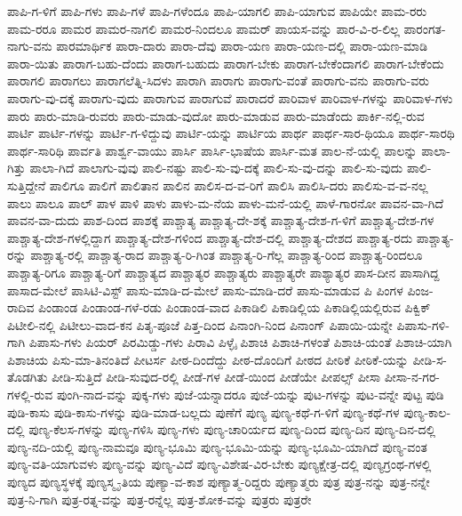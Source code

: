 {ಪಾಪಿ-ಗ-ಳಿಗೆ
ಪಾಪಿ-ಗಳು
ಪಾಪಿ-ಗಳೆ
ಪಾಪಿ-ಗಳೆಂದೂ
ಪಾಪಿ-ಯಾಗಲಿ
ಪಾಪಿ-ಯಾಗುವ
ಪಾಪಿಯೇ
ಪಾಮ-ರರು
ಪಾಮ-ರರೂ
ಪಾಮರ
ಪಾಮರ-ನಾಗಲಿ
ಪಾಮರ-ನಿಂದಲೂ
ಪಾಮರ್
ಪಾಯಸ-ವನ್ನು
ಪಾರ-ವಿ-ರ-ಲಿಲ್ಲ
ಪಾರಂಗತ-ನಾಗು-ವನು
ಪಾರಮಾರ್ಥಿಕ
ಪಾರಾ-ದಾರು
ಪಾರಾ-ದೆವು
ಪಾರಾ-ಯಣ
ಪಾರಾ-ಯಣ-ದಲ್ಲಿ
ಪಾರಾ-ಯಣ-ಮಾಡಿ
ಪಾರಾ-ಯಿತು
ಪಾರಾಗ-ಬಹು-ದೆಂದು
ಪಾರಾಗ-ಬಹುದು
ಪಾರಾಗ-ಬೇಕು
ಪಾರಾಗ-ಬೇಕೆಂದಾಗಲಿ
ಪಾರಾಗ-ಬೇಕೆಂದು
ಪಾರಾಗಲಿ
ಪಾರಾಗಲು
ಪಾರಾಗಲೆತ್ನಿ-ಸಿದಳು
ಪಾರಾಗಿ
ಪಾರಾಗು
ಪಾರಾಗು-ವಂತೆ
ಪಾರಾಗು-ವನು
ಪಾರಾಗು-ವರು
ಪಾರಾಗು-ವು-ದಕ್ಕೆ
ಪಾರಾಗು-ವುದು
ಪಾರಾಗುವ
ಪಾರಾಗುವೆ
ಪಾರಾದರೆ
ಪಾರಿವಾಳ
ಪಾರಿವಾಳ-ಗಳನ್ನು
ಪಾರಿವಾಳ-ಗಳು
ಪಾರು
ಪಾರು-ಮಾಡಿ-ರುವರು
ಪಾರು-ಮಾಡು-ವುದೋ
ಪಾರು-ಮಾಡುವ
ಪಾರು-ಮಾಡೆಂದು
ಪಾರ್ಕಿ-ನಲ್ಲಿ-ರುವ
ಪಾರ್ಟಿ
ಪಾರ್ಟಿ-ಗಳನ್ನು
ಪಾರ್ಟಿ-ಗ-ಳಿದ್ದುವು
ಪಾರ್ಟಿ-ಯನ್ನು
ಪಾರ್ಟಿಯ
ಪಾರ್ಥ
ಪಾರ್ಥ-ಸಾರ-ಥಿಯೂ
ಪಾರ್ಥ-ಸಾರಥಿ
ಪಾರ್ಥ-ಸಾರಿಥಿ
ಪಾರ್ವತಿ
ಪಾರ್ಶ್ವ-ವಾಯು
ಪಾರ್ಸಿ
ಪಾರ್ಸಿ-ಭಾಷೆಯ
ಪಾರ್ಸಿ-ಮತ
ಪಾಲ-ನೆ-ಯಲ್ಲಿ
ಪಾಲನ್ನು
ಪಾಲಾ-ಗಿತ್ತು
ಪಾಲಾ-ಗಿದೆ
ಪಾಲಾಗು-ವುವು
ಪಾಲಿ-ನಷ್ಟು
ಪಾಲಿ-ಸು-ವು-ದಕ್ಕೆ
ಪಾಲಿ-ಸು-ವು-ದನ್ನು
ಪಾಲಿ-ಸು-ವುದು
ಪಾಲಿ-ಸುತ್ತಿದ್ದೇನೆ
ಪಾಲಿಗೂ
ಪಾಲಿಗೆ
ಪಾಲಿತಾನ
ಪಾಲಿನ
ಪಾಲಿಸ-ದ-ವ-ರಿಗೆ
ಪಾಲಿಸಿ
ಪಾಲಿಸಿ-ದರು
ಪಾಲಿಸು-ವ-ವ-ನಲ್ಲ
ಪಾಲು
ಪಾಲೂ
ಪಾಲ್
ಪಾಳ
ಪಾಳಿ
ಪಾಳು
ಪಾಳು-ಮ-ನೆಯ
ಪಾಳು-ಮನೆ-ಯಲ್ಲಿ
ಪಾಳೆ-ಗಾರನೋ
ಪಾವನ-ವಾ-ಗಿದೆ
ಪಾವನ-ವಾ-ದುದು
ಪಾಶ-ದಿಂದ
ಪಾಶಕ್ಕೆ
ಪಾಶ್ಚಾತ್ಯ
ಪಾಶ್ಚಾತ್ಯ-ದೇ-ಶಕ್ಕೆ
ಪಾಶ್ಚಾತ್ಯ-ದೇಶ-ಗ-ಳಿಗೆ
ಪಾಶ್ಚಾತ್ಯ-ದೇಶ-ಗಳ
ಪಾಶ್ಚಾತ್ಯ-ದೇಶ-ಗಳಲ್ಲಿದ್ದಾಗ
ಪಾಶ್ಚಾತ್ಯ-ದೇಶ-ಗಳಿಂದ
ಪಾಶ್ಚಾತ್ಯ-ದೇಶ-ದಲ್ಲಿ
ಪಾಶ್ಚಾತ್ಯ-ದೇಶದ
ಪಾಶ್ಚಾತ್ಯ-ರದು
ಪಾಶ್ಚಾತ್ಯ-ರನ್ನು
ಪಾಶ್ಚಾತ್ಯ-ರಲ್ಲಿ
ಪಾಶ್ಚಾತ್ಯ-ರಾದ
ಪಾಶ್ಚಾತ್ಯ-ರಿ-ಗಿಂತ
ಪಾಶ್ಚಾತ್ಯ-ರಿ-ಗೆಲ್ಲ
ಪಾಶ್ಚಾತ್ಯ-ರಿಂದ
ಪಾಶ್ಚಾತ್ಯ-ರಿಂದಲೂ
ಪಾಶ್ಚಾತ್ಯ-ರಿಗೂ
ಪಾಶ್ಚಾತ್ಯ-ರಿಗೆ
ಪಾಶ್ಚಾತ್ಯದ
ಪಾಶ್ಚಾತ್ಯರ
ಪಾಶ್ಚಾತ್ಯರು
ಪಾಶ್ಚಾತ್ಯರೇ
ಪಾಶ್ಯಾತ್ಯರ
ಪಾಸ-ದೀನ
ಪಾಸಾಗಿದ್ದ
ಪಾಸಾದ-ಮೇಲೆ
ಪಾಸಿಟಿ-ವಿಸ್ಟ್
ಪಾಸು-ಮಾಡಿ-ದ-ಮೇಲೆ
ಪಾಸು-ಮಾಡಿ-ದರೆ
ಪಾಸು-ಮಾಡುವ
ಪಿ
ಪಿಂಗಳ
ಪಿಂಜ-ರಾದಿವ
ಪಿಂಡಾಂಡ
ಪಿಂಡಾಂಡ-ಗಳೆ-ರಡು
ಪಿಂಡಾಂಡ-ವಾದ
ಪಿಕಾಡಿಲಿ
ಪಿಕಾಡಿಲ್ಲಿಯ
ಪಿಕಾಡಿಲ್ಲಿಯಲ್ಲಿರುವ
ಪಿಕ್ವಿಕ್
ಪಿಟೀಲಿ-ನಲ್ಲಿ
ಪಿಟೀಲು-ವಾದ-ಕನ
ಪಿತೃ-ಪೂಜೆ
ಪಿತ್ತ-ದಿಂದ
ಪಿನಾಂಗಿ-ನಿಂದ
ಪಿನಾಂಗ್
ಪಿಪಾಯಿ-ಯನ್ನೇ
ಪಿಪಾಸು-ಗಳಿ-ಗಾಗಿ
ಪಿಪಾಸು-ಗಳು
ಪಿಯರ್
ಪಿರಮಿಡ್ಡು-ಗಳು
ಪಿರಾವಿ
ಪಿಳ್ಳೈ
ಪಿಶಾಚಿ
ಪಿಶಾಚಿ-ಗಳಂತೆ
ಪಿಶಾಚಿ-ಯಂತೆ
ಪಿಶಾಚಿ-ಯಾಗಿ
ಪಿಶಾಚಿಯ
ಪಿಸು-ಮಾ-ತಿನಂತಿದೆ
ಪೀಟರ್ಸ
ಪೀಠ-ದಿಂದೆದ್ದು
ಪೀಠ-ದೊಂದಿಗೆ
ಪೀಠದ
ಪೀಠಿಕೆ
ಪೀಠಿಕೆ-ಯನ್ನು
ಪೀಡಿ-ಸ-ತೊಡಗಿತು
ಪೀಡಿ-ಸುತ್ತಿದೆ
ಪೀಡಿ-ಸುವುದ-ರಲ್ಲಿ
ಪೀಡೆ-ಗಳ
ಪೀಡೆ-ಯಿಂದ
ಪೀಡೆಯೇ
ಪೀಪಲ್ಸ್
ಪೀಸಾ
ಪೀಸಾ-ನ-ಗರ-ಗಳಲ್ಲಿ-ರುವ
ಪುಂಗಿ-ನಾದ-ವನ್ನು
ಪುಕ್ಕ-ಗಳು
ಪುಜೆ-ಯನ್ನಾದರೂ
ಪುಜೆ-ಯನ್ನು
ಪುಟ-ಗಳನ್ನು
ಪುಟ-ವನ್ನೇ
ಪುಟ್ಟ
ಪುಡಿ
ಪುಡಿ-ಕಾಸು
ಪುಡಿ-ಕಾಸು-ಗಳನ್ನು
ಪುಡಿ-ಮಾಡ-ಬಲ್ಲದು
ಪುಣೆಗೆ
ಪುಣ್ಯ
ಪುಣ್ಯ-ಕಥೆ-ಗ-ಳಿಗೆ
ಪುಣ್ಯ-ಕಥೆ-ಗಳ
ಪುಣ್ಯ-ಕಾಲ-ದಲ್ಲಿ
ಪುಣ್ಯ-ಕೆಲಸ-ಗಳನ್ನು
ಪುಣ್ಯ-ಗಳಿಸಿ
ಪುಣ್ಯ-ಗಳು
ಪುಣ್ಯ-ಚಾರಿರ್ಯದ
ಪುಣ್ಯ-ದಿಂದ
ಪುಣ್ಯ-ದಿನ
ಪುಣ್ಯ-ದಿನ-ದಲ್ಲಿ
ಪುಣ್ಯ-ನದಿ-ಯಲ್ಲಿ
ಪುಣ್ಯ-ನಾಮವೂ
ಪುಣ್ಯ-ಭೂಮಿ
ಪುಣ್ಯ-ಭೂಮಿ-ಯನ್ನು
ಪುಣ್ಯ-ಭೂಮಿ-ಯಾಗಿದೆ
ಪುಣ್ಯ-ವಂತ
ಪುಣ್ಯ-ವತಿ-ಯಾಗುವಳು
ಪುಣ್ಯ-ವನ್ನು
ಪುಣ್ಯ-ವಿದೆ
ಪುಣ್ಯ-ವಿಶೇಷ-ವಿರ-ಬೇಕು
ಪುಣ್ಯಕ್ಷೇತ್ರ-ದಲ್ಲಿ
ಪುಣ್ಯಗ್ರಂಥ-ಗಳಲ್ಲಿ
ಪುಣ್ಯದ
ಪುಣ್ಯಸ್ಥಳಕ್ಕೆ
ಪುಣ್ಯಸ್ಮೃ-ತಿಯ
ಪುಣ್ಯಾ-ವ-ಕಾಶ
ಪುಣ್ಯಾತ್ಮ-ರಿದ್ದರು
ಪುಣ್ಯಾತ್ಮರು
ಪುತ್ರ
ಪುತ್ರ-ನನ್ನು
ಪುತ್ರ-ನನ್ನೇ
ಪುತ್ರ-ನಿ-ಗಾಗಿ
ಪುತ್ರ-ರತ್ನ-ವನ್ನು
ಪುತ್ರ-ರನ್ನೆಲ್ಲ
ಪುತ್ರ-ಶೋಕ-ವನ್ನು
ಪುತ್ರರು
ಪುತ್ರರೇ
}
